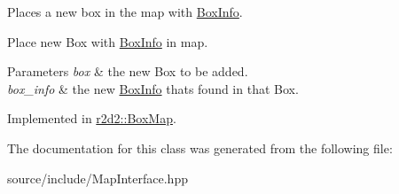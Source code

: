 Places a new box in the map with \hyperlink{classr2d2_1_1_box_info}{Box\+Info}. 

Place new Box with \hyperlink{classr2d2_1_1_box_info}{Box\+Info} in map.


\begin{DoxyParams}{Parameters}
{\em box} & the new Box to be added. \\
\hline
{\em box\+\_\+info} & the new \hyperlink{classr2d2_1_1_box_info}{Box\+Info} thats found in that Box. \\
\hline
\end{DoxyParams}


Implemented in \hyperlink{classr2d2_1_1_box_map_ac421b31be9f2e2248127f21f3299883d}{r2d2\+::\+Box\+Map}.



The documentation for this class was generated from the following file\+:\begin{DoxyCompactItemize}
\item 
source/include/Map\+Interface.\+hpp\end{DoxyCompactItemize}
